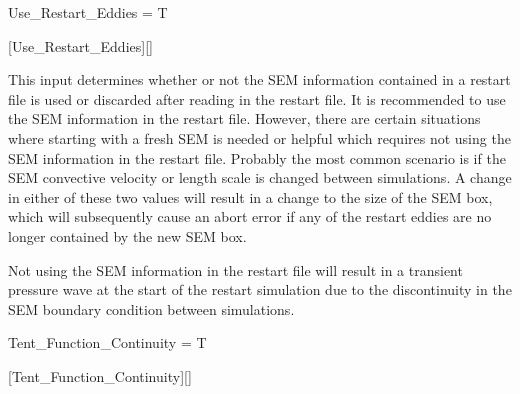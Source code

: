\begin{nmldescitem}
Use_Restart_Eddies = T
\end{nmldescitem}
[Use\_Restart\_Eddies][]

\begin{nmldescbody}
This input determines whether or not the SEM information contained in a restart
file is used or discarded after reading in the restart file.
%
It is recommended to use the SEM information in the restart file.
%
However, there are certain situations where starting with a fresh SEM is needed
or helpful which requires not using the SEM information in the restart file.
%
Probably the most common scenario is if the SEM convective velocity or length
scale is changed between simulations.
%
A change in either of these two values will result in a change to the size
of the SEM box, which will subsequently cause an abort error if any of the
restart eddies are no longer contained by the new SEM box.

\NOTE
Not using the SEM information in the restart file will result in a transient
pressure wave at the start of the restart simulation due to the discontinuity in
the SEM boundary condition between simulations.
\end{nmldescbody}


\FINALFIX{\newpage}
\begin{nmldescitem}
Tent_Function_Continuity = T
\end{nmldescitem}
[Tent\_Function\_Continuity][]

